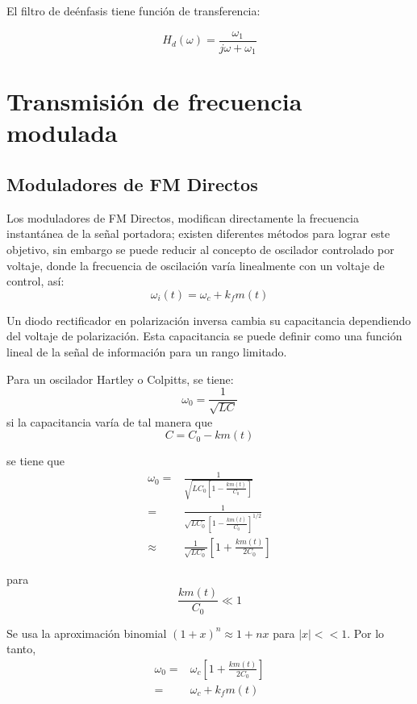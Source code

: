 \documentclass[12pt,letterpaper,titlepage,twoside]{book}
\begin{document}
El filtro de deénfasis tiene función de transferencia:

\begin{equation}
H_d(\omega)  = \frac{\omega_1}{j\omega + \omega_1}
\end{equation}


\section{Transmisión de frecuencia modulada}
\subsection{Moduladores de FM Directos}
Los moduladores de FM Directos, modifican directamente la frecuencia instantánea de la señal portadora; existen diferentes métodos para lograr este objetivo, sin embargo se puede reducir al concepto de oscilador controlado por voltaje, donde la frecuencia de oscilación varía linealmente con un voltaje de control, así:
\begin{equation}
\omega_i (t) = \omega_c+k_f m(t)
\end{equation}

Un diodo rectificador en polarización inversa cambia su capacitancia dependiendo del voltaje de polarización. Esta capacitancia se puede definir como una función lineal de la señal de información para un rango limitado.

Para un oscilador Hartley o Colpitts, se tiene:
\begin{equation}
\omega_0 = \frac{1}{\sqrt{LC}}
\end{equation}
si la capacitancia varía de tal manera que 
\begin{equation}
C = C_0 -k m(t)
\end{equation}

se tiene que
\begin{align}
\omega_0 =& \frac{1}{\sqrt{LC_0 \left[ 1 - \frac{k m(t)}{C_0} \right] }}\\
   =& \frac{1}{\sqrt{LC_0} \left[ 1 - \frac{k m(t)}{C_0} \right]^{1/2} }\\
   \approx& \frac{1}{\sqrt{LC_0}} \left[ 1 + \frac{k m(t)}{2 C_0} \right]
\end{align}

para $$ \frac{k m(t)}{C_0} \ll 1 $$

Se usa la aproximación binomial $\left(1+x \right)^n \approx 1+nx$ para $\vert x \vert << 1$. Por lo tanto, 
\begin{align}
\omega_0 =& \omega_c \left[ 1 + \frac{k m(t)}{2 C_0} \right]\\
=& \omega_c + k_f m(t)
\end{align}
\end{document}
